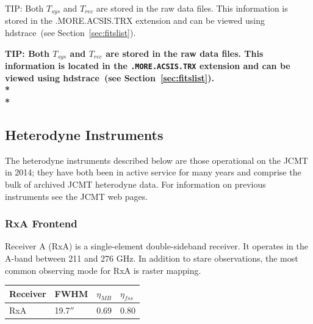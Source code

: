 \documentclass[twoside,11pt]{article}
\newcommand{\htmlref}[2]{#1}
\newenvironment{latexonly}{}{}
\newcommand{\latexhtml}[2]{#1}
\newcommand{\xref}[3]{#1}
\newcommand{\xlabel}[1]{}
\renewcommand{\_}{\texttt{\symbol{95}}}
\newenvironment{fmpage}[1]{\begin{lrbox}{\fmbox}\begin{minipage}{#1}}{\end{minipage}\end{lrbox}\fbox{\usebox{\fmbox}}}
\newcommand{\task}[1]{\textsf{#1}}
\newcommand{\hdstrace}{\xref{\task{hdstrace}}{sun95}{HDSTRACE}}
\newcommand{\cref}[3]{\latexhtml{#1~\ref{#2}}{\htmlref{#3}{#2}}}
\begin{document}
\begin{latexonly}
\begin{center}
\begin{fmpage}{0.95\linewidth}
\vspace{0.1cm}
TIP: Both $T_{sys}$ and $T_{rec}$ are stored in the raw data files. This information is stored in the .MORE.ACSIS.TRX extension and can be viewed using \hdstrace\ (see \cref{Section}{sec:fitslist}{How can I view the metadata?}).
\end{fmpage}
\end{center}
\end{latexonly}

\begin{htmlonly}
\textbf{TIP: Both $T_{sys}$ and $T_{rec}$ are stored in the raw data files. This information is located in the \texttt{.MORE.ACSIS.TRX} extension and can be viewed using \hdstrace\ (see \cref{Section}{sec:fitslist}{How can I view the metadata?}).\\*\\*}
\end{htmlonly}


\subsection{\xlabel{rxa}Heterodyne Instruments}
\label{sec:instruments}

The heterodyne instruments described below are those operational on the JCMT in 2014; they have both been in active service for many years and comprise the bulk of archived JCMT heterodyne data. For information on previous instruments see the JCMT web pages.

\subsubsection{RxA Frontend}
Receiver A (RxA) is a single-element double-sideband receiver. It operates in the A-band between 211 and 276 GHz. In addition to stare observations, the most common observing mode for RxA is raster mapping.
\begin{table}[h!]
\begin{center}
\begin{tabular}{|p{1.5cm}|p{1.2cm}|p{0.8cm}|p{0.8cm}|}
\hline
Receiver &FWHM & $\eta_{MB}$ & $\eta_{fss}$\\
\hline
RxA&19.7$''$&0.69 & 0.80\\
\hline
\end{tabular}
\end{center}
\end{table}
\end{document}
